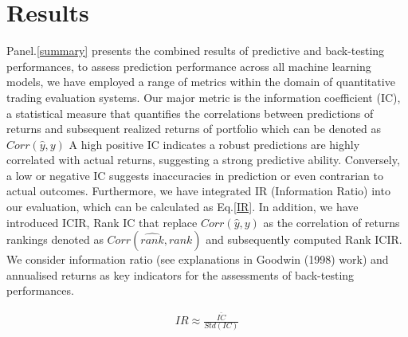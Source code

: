 \documentclass[10pt,letterpaper]{article}
\begin{document}




\section*{Results}
Panel.\ref{summary} presents the combined results of predictive and back-testing performances, to assess prediction performance across all machine learning models, we have employed a range of metrics within the domain of quantitative trading evaluation systems. Our major metric is the information coefficient (IC), a statistical measure that quantifies the correlations between predictions of returns and subsequent realized returns of portfolio which can be denoted as \(Corr(\hat{y},{y})\)  A high positive IC indicates a robust predictions are highly correlated with actual returns, suggesting a strong predictive ability. Conversely, a low or negative IC suggests inaccuracies in prediction or even contrarian to actual outcomes. Furthermore, we have integrated IR (Information  Ratio) into our evaluation, which can be calculated as Eq.\ref{IR}. In addition, we have introduced ICIR, Rank IC that replace \(Corr(\hat{y},{y})\) as the correlation of returns rankings denoted as \(Corr(\hat{rank},{rank})\) and subsequently computed Rank ICIR. We consider information ratio (see explanations in Goodwin (1998) work) and annualised returns as key indicators for the assessments of back-testing performances.

\begin{eqnarray}
\label{IR}
IR \approx \frac{\bar{IC}}{Std(IC)}
\end{eqnarray}
\end{document}
